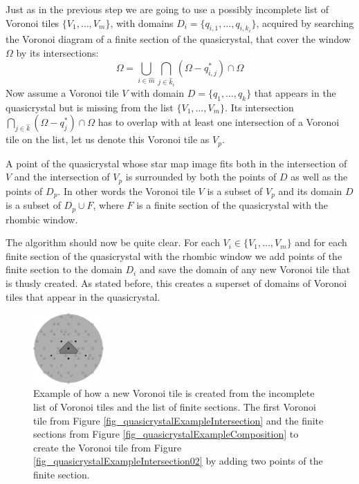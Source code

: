 \documentclass[text.tex]{subfiles}
\begin{document}
Just as in the previous step we are going to use a possibly incomplete list of Voronoi tiles $\{V_1,\dots,V_m\}$, with domains $D_i = \{q_{i,1},\dots,q_{i,k_i}\}$, acquired by searching the Voronoi diagram of a finite section of the quasicrystal, that cover the window $\Omega$ by its intersections:
$$\Omega = \bigcup\limits_{i\in\hat{m}}\bigcap\limits_{j\in\hat{k}_i}(\Omega-q_{i,j}^\ast)\cap\Omega$$ 
Now assume a Voronoi tile $V$ with domain $D = \{q_1,\dots,q_k\}$ that appears in the quasicrystal but is missing from the list $\{V_1,\dots,V_m\}$. Its intersection $\bigcap_{j\in\hat{k}}(\Omega-q_j^\ast)\cap\Omega$ has to overlap with at least one intersection of a Voronoi tile on the list, let us denote this Voronoi tile as $V_p$. 

A point of the quasicrystal whose star map image fits both in the intersection of $V$ and the intersection of $V_p$ is surrounded by both the points of $D$ as well as the points of $D_p$. In other words the Voronoi tile $V$  is a subset of $V_p$ and its domain $D$ is a subset of $D_p\cup F$, where $F$ is a finite section of the quasicrystal with the rhombic window. 

The algorithm should now be quite clear. For each $V_i\in\{V_1,\dots,V_m\}$ and for each finite section of the quasicrystal with the rhombic window we add points of the finite section to the domain $D_i$ and save the domain of any new Voronoi tile that is thusly created. As stated before, this creates a superset of domains of Voronoi tiles that appear in the quasicrystal. 

\begin{figure}[h!]
\centering
\includegraphics[width=0.24\textwidth]{img/2D/cropByFiniteSection}
\caption{Example of how a new Voronoi tile is created from the incomplete list of Voronoi tiles and the list of finite sections. The first Voronoi tile from Figure \ref{fig_quasicrystalExampleIntersection} and the finite sections from Figure \ref{fig_quasicrystalExampleComposition} to create the Voronoi tile from Figure \ref{fig_quasicrystalExampleIntersection02} by adding two points of the finite section. }
\label{fig_quasicrystalExampleNewTile}
\end{figure}
\end{document}
